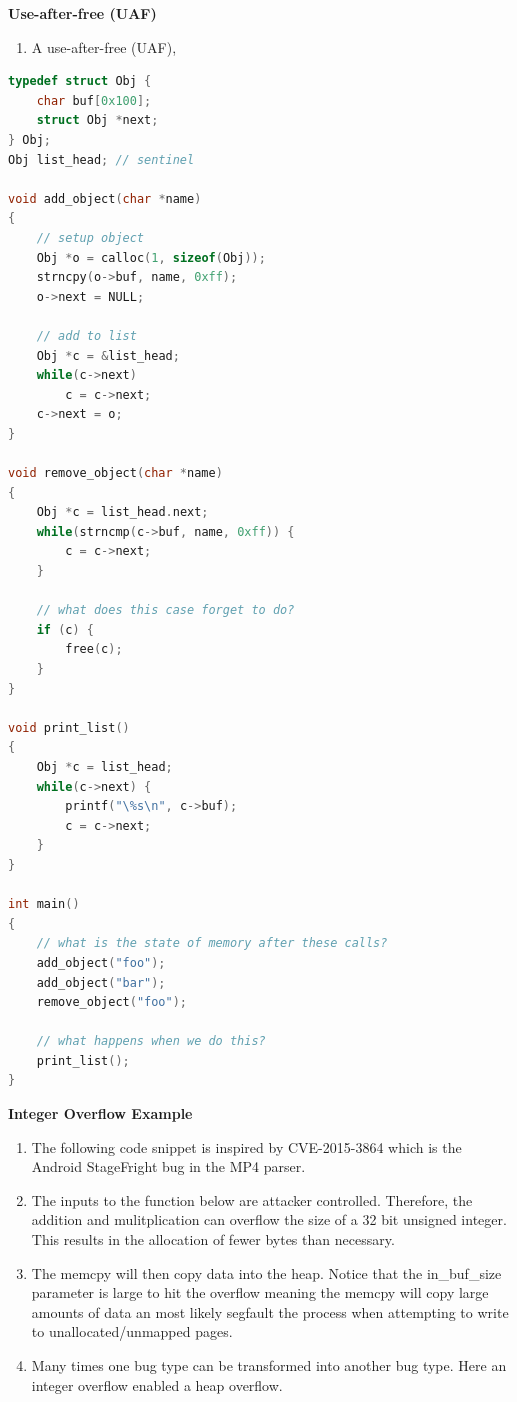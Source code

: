 \documentclass[12pt]{Training}
\begin{document}
\textbf{Use-after-free (UAF)}
\begin{enumerate}
    \item A use-after-free (UAF), 
\end{enumerate}
\begin{sectionbox}
\begin{lstlisting}[language=C, caption={Use-after-free}]
typedef struct Obj {
    char buf[0x100];
    struct Obj *next;
} Obj;
Obj list_head; // sentinel

void add_object(char *name)
{
    // setup object
    Obj *o = calloc(1, sizeof(Obj));
    strncpy(o->buf, name, 0xff);
    o->next = NULL;

    // add to list
    Obj *c = &list_head;
    while(c->next)
        c = c->next;
    c->next = o;
}

void remove_object(char *name)
{
    Obj *c = list_head.next;
    while(strncmp(c->buf, name, 0xff)) {
        c = c->next;
    }

    // what does this case forget to do?
    if (c) {
        free(c);
    }
}

void print_list()
{
    Obj *c = list_head;
    while(c->next) {
        printf("\%s\n", c->buf);
        c = c->next;
    }
}

int main()
{
    // what is the state of memory after these calls?
    add_object("foo");
    add_object("bar");
    remove_object("foo");

    // what happens when we do this?
    print_list();
}
\end{lstlisting}
\end{sectionbox}

\textbf{Integer Overflow Example}
\begin{enumerate}
	\item The following code snippet is inspired by CVE-2015-3864 which is the Android StageFright bug in the MP4 parser.
	\item The inputs to the function below are attacker controlled. Therefore, the addition and mulitplication can overflow the size of a 32 bit unsigned integer. This results in the allocation of fewer bytes than necessary.
	\item The memcpy will then copy data into the heap. Notice that the in\_buf\_size parameter is large to hit the overflow meaning the memcpy will copy large amounts of data an most likely segfault the process when attempting to write to unallocated/unmapped pages.
	\item Many times one bug type can be transformed into another bug type. Here an integer overflow enabled a heap overflow.
\end{enumerate}
\end{document}
